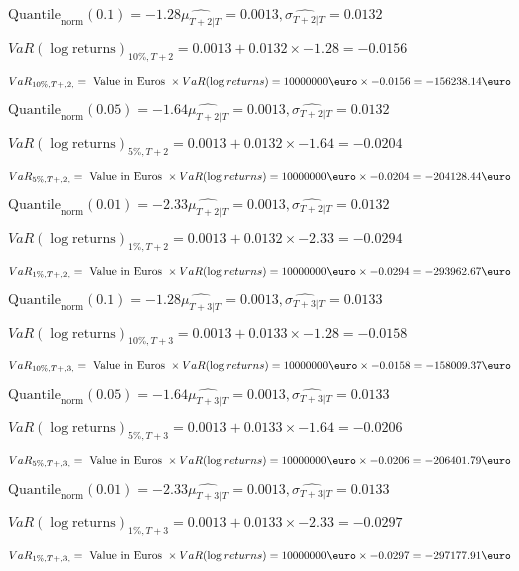 $\text{Quantile}_\text{norm}(0.1) = -1.28$$\hat{\mu_{T+2|T}} = 0.0013, \hat{\sigma_{T+2|T}} = 0.0132$

$VaR(\log \text{returns})_{10\%, T + 2} = 0.0013 + 0.0132\times-1.28 = -0.0156$

$VaR_{10\%, T + ,2,} = \text{ Value in Euros } \times VaR(\log returns) = 10 000 000 \text{\euro} \times-0.0156 = -156238.14 \text{\euro}$


$\text{Quantile}_\text{norm}(0.05) = -1.64$$\hat{\mu_{T+2|T}} = 0.0013, \hat{\sigma_{T+2|T}} = 0.0132$

$VaR(\log \text{returns})_{5\%, T + 2} = 0.0013 + 0.0132\times-1.64 = -0.0204$

$VaR_{5\%, T + ,2,} = \text{ Value in Euros } \times VaR(\log returns) = 10 000 000 \text{\euro} \times-0.0204 = -204128.44 \text{\euro}$


$\text{Quantile}_\text{norm}(0.01) = -2.33$$\hat{\mu_{T+2|T}} = 0.0013, \hat{\sigma_{T+2|T}} = 0.0132$

$VaR(\log \text{returns})_{1\%, T + 2} = 0.0013 + 0.0132\times-2.33 = -0.0294$

$VaR_{1\%, T + ,2,} = \text{ Value in Euros } \times VaR(\log returns) = 10 000 000 \text{\euro} \times-0.0294 = -293962.67 \text{\euro}$


$\text{Quantile}_\text{norm}(0.1) = -1.28$$\hat{\mu_{T+3|T}} = 0.0013, \hat{\sigma_{T+3|T}} = 0.0133$

$VaR(\log \text{returns})_{10\%, T + 3} = 0.0013 + 0.0133\times-1.28 = -0.0158$

$VaR_{10\%, T + ,3,} = \text{ Value in Euros } \times VaR(\log returns) = 10 000 000 \text{\euro} \times-0.0158 = -158009.37 \text{\euro}$


$\text{Quantile}_\text{norm}(0.05) = -1.64$$\hat{\mu_{T+3|T}} = 0.0013, \hat{\sigma_{T+3|T}} = 0.0133$

$VaR(\log \text{returns})_{5\%, T + 3} = 0.0013 + 0.0133\times-1.64 = -0.0206$

$VaR_{5\%, T + ,3,} = \text{ Value in Euros } \times VaR(\log returns) = 10 000 000 \text{\euro} \times-0.0206 = -206401.79 \text{\euro}$


$\text{Quantile}_\text{norm}(0.01) = -2.33$$\hat{\mu_{T+3|T}} = 0.0013, \hat{\sigma_{T+3|T}} = 0.0133$

$VaR(\log \text{returns})_{1\%, T + 3} = 0.0013 + 0.0133\times-2.33 = -0.0297$

$VaR_{1\%, T + ,3,} = \text{ Value in Euros } \times VaR(\log returns) = 10 000 000 \text{\euro} \times-0.0297 = -297177.91 \text{\euro}$


